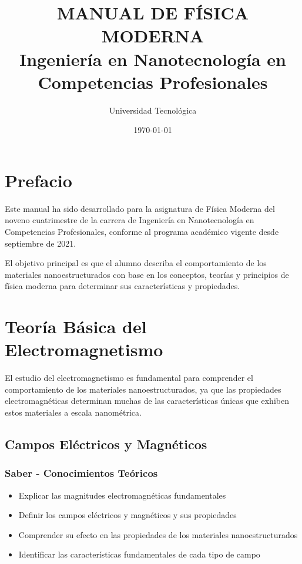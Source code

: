 \documentclass[12pt,a4paper,twoside]{book}
\title{\textbf{MANUAL DE FÍSICA MODERNA}\\
	\large Ingeniería en Nanotecnología en Competencias Profesionales}
\author{Universidad Tecnológica}
\date{\today}
\begin{document}
	
	\frontmatter
	\maketitle
	
	\tableofcontents
	\listoffigures
	\listoftables
	
	\chapter*{Prefacio}
	Este manual ha sido desarrollado para la asignatura de Física Moderna del noveno cuatrimestre de la carrera de Ingeniería en Nanotecnología en Competencias Profesionales, conforme al programa académico vigente desde septiembre de 2021.
	
	El objetivo principal es que el alumno describa el comportamiento de los materiales nanoestructurados con base en los conceptos, teorías y principios de física moderna para determinar sus características y propiedades.
	
	\mainmatter
	
	\chapter{Teoría Básica del Electromagnetismo}
	\label{chap:electromagnetismo}
	
	El estudio del electromagnetismo es fundamental para comprender el comportamiento de los materiales nanoestructurados, ya que las propiedades electromagnéticas determinan muchas de las características únicas que exhiben estos materiales a escala nanométrica.
	
	\section{Campos Eléctricos y Magnéticos}
	\label{sec:campos_electromagneticos}
	
	\subsection{Saber - Conocimientos Teóricos}
	\begin{saberbox}
		\begin{itemize}
			\item Explicar las magnitudes electromagnéticas fundamentales
			\item Definir los campos eléctricos y magnéticos y sus propiedades
			\item Comprender su efecto en las propiedades de los materiales nanoestructurados
			\item Identificar las características fundamentales de cada tipo de campo
		\end{itemize}
	\end{saberbox}
	
\end{document}
